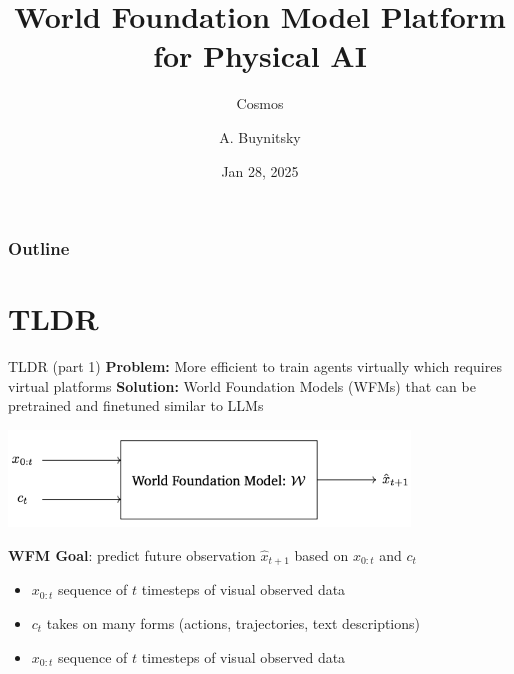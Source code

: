 \documentclass{beamer}
\title[Cosmos ]{World Foundation Model Platform for Physical AI}
\subtitle{Cosmos} %
\author[MLP]{A. Buynitsky}
\date{Jan 28, 2025}
\begin{document}
\frame{\titlepage}


\begin{frame}
\frametitle{Outline}
\tableofcontents
\end{frame}
\section{TLDR}
\begin{frame}[t]{TLDR (part 1)}
    \textbf{Problem:} More efficient to train agents virtually which requires virtual platforms \newline
    \pause
    \textbf{Solution:} World Foundation Models (WFMs) that can be pretrained and finetuned similar to LLMs\newline
    \begin{center}
        \includegraphics[width=0.8\textwidth]{./img/tldr_2.png}
    \end{center} \pause
    \textbf{WFM Goal}: predict future observation $\hat{x}_{t+1}$ based on $ x_{0:t}$ and $c_t$
    \small
    \begin{itemize}[label=-]
        \item $ x_{0:t}$ sequence of $t$ timesteps of visual observed data
        \item $c_t$ takes on many forms (actions, trajectories, text descriptions)
        \item $ x_{0:t}$ sequence of $t$ timesteps of visual observed data
    \end{itemize}
    \normalsize
            
\end{frame}
\end{document}
